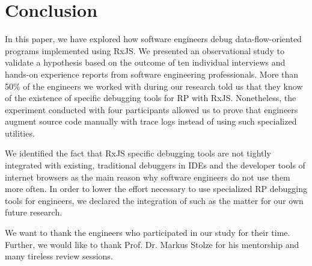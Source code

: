 \documentclass[sigplan,screen,review]{acmart}
\begin{document}
\section{Conclusion}
\label{sec:conclusion}

In this paper, we have explored how software engineers debug data-flow-oriented programs implemented using RxJS. We presented an observational study to validate a hypothesis based on the outcome of ten individual interviews and hands-on experience reports from software engineering professionals. More than 50\% of the engineers we worked with during our research told us that they know of the existence of specific debugging tools for RP with RxJS. Nonetheless, the experiment conducted with four participants allowed us to prove that engineers augment source code manually with trace logs instead of using such specialized utilities.

We identified the fact that RxJS specific debugging tools are not tightly integrated with existing, traditional debuggers in IDEs and the developer tools of internet browsers as the main reason why software engineers do not use them more often. In order to lower the effort necessary to use specialized RP debugging tools for engineers, we declared the integration of such as the matter for our own future research.

\begin{acks}
	We want to thank the engineers who participated in our study for their time. Further, we would like to thank Prof. Dr. Markus Stolze for his mentorship and many tireless review sessions.
\end{acks}



\end{document}
